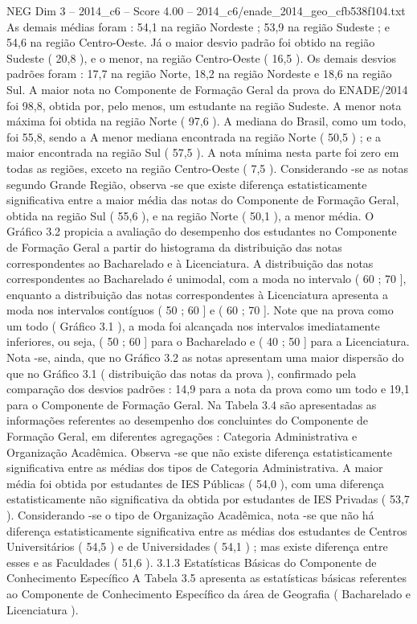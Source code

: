 \begin{textsample}{NEG Dim 3 – 2014\_c6 – Score 4.00 – 2014\_c6/enade\_2014\_geo\_cfb538f104.txt}
As demais médias foram : 54,1 na região Nordeste ; 53,9 na região Sudeste ; e 54,6 na região Centro-Oeste.
Já o maior desvio padrão foi obtido na região Sudeste ( 20,8 ), e o menor, na região Centro-Oeste ( 16,5 ).
Os demais desvios padrões foram : 17,7 na região Norte, 18,2 na região Nordeste e 18,6 na região Sul.
A maior nota no Componente de Formação Geral da prova do ENADE/2014 foi 98,8, obtida por, pelo menos, um estudante na região Sudeste.
A menor nota máxima foi obtida na região Norte ( 97,6 ).
A mediana do Brasil, como um todo, foi 55,8, sendo a A menor mediana encontrada na região Norte ( 50,5 ) ; e a maior encontrada na região Sul ( 57,5 ).
A nota mínima nesta parte foi zero em todas as regiões, exceto na região Centro-Oeste ( 7,5 ).
Considerando -se as notas segundo Grande Região, observa -se que existe diferença estatisticamente significativa entre a maior média das notas do Componente de Formação Geral, obtida na região Sul ( 55,6 ), e na região Norte ( 50,1 ), a menor média.
O Gráfico 3.2 propicia a avaliação do desempenho dos estudantes no Componente de Formação Geral a partir do histograma da distribuição das notas correspondentes ao Bacharelado e à Licenciatura.
A distribuição das notas correspondentes ao Bacharelado é unimodal, com a moda no intervalo ( 60 ; 70 ], enquanto a distribuição das notas correspondentes à Licenciatura apresenta a moda nos intervalos contíguos ( 50 ; 60 ] e ( 60 ; 70 ].
Note que na prova como um todo ( Gráfico 3.1 ), a moda foi alcançada nos intervalos imediatamente inferiores, ou seja, ( 50 ; 60 ] para o Bacharelado e ( 40 ; 50 ] para a Licenciatura.
Nota -se, ainda, que no Gráfico 3.2 as notas apresentam uma maior dispersão do que no Gráfico 3.1 ( distribuição das notas da prova ), confirmado pela comparação dos desvios padrões : 14,9 para a nota da prova como um todo e 19,1 para o Componente de Formação Geral.
Na Tabela 3.4 são apresentadas as informações referentes ao desempenho dos concluintes do Componente de Formação Geral, em diferentes agregações : Categoria Administrativa e Organização Acadêmica.
Observa -se que não existe diferença estatisticamente significativa entre as médias dos tipos de Categoria Administrativa.
A maior média foi obtida por estudantes de IES Públicas ( 54,0 ), com uma diferença estatisticamente não significativa da obtida por estudantes de IES Privadas ( 53,7 ).
Considerando -se o tipo de Organização Acadêmica, nota -se que não há diferença estatisticamente significativa entre as médias dos estudantes de Centros Universitários ( 54,5 ) e de Universidades ( 54,1 ) ; mas existe diferença entre esses e as Faculdades ( 51,6 ). 3.1.3 Estatísticas Básicas do Componente de Conhecimento Específico A Tabela 3.5 apresenta as estatísticas básicas referentes ao Componente de Conhecimento Específico da área de Geografia ( Bacharelado e Licenciatura ).

\end{textsample}
